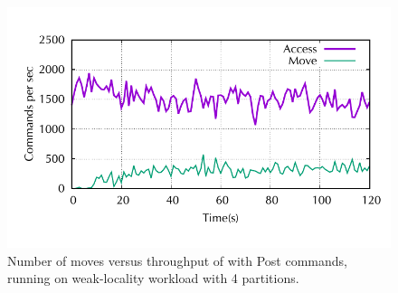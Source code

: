 \begin{figure}[ht!]
\begin{minipage}[b]{1\linewidth}
\centering
      \includegraphics[width=0.6\linewidth]{figures/experiments/dssmr/move-vs-throughput-weak}
\end{minipage}
\caption{Number of moves versus throughput of \dssmr{} with Post commands, running on weak-locality workload with 4 partitions.}
\label{fig:dssmr-move-vs-tp-weak}
\end{figure}

